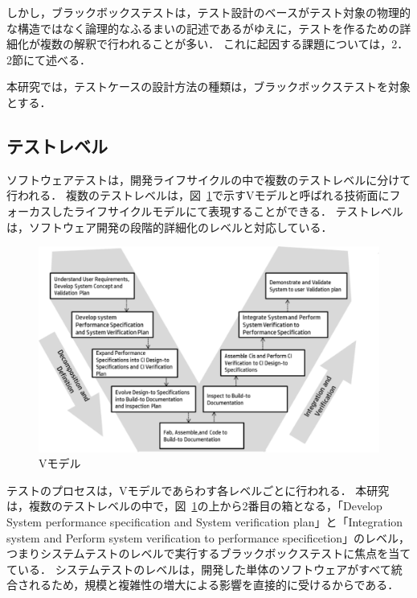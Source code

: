 しかし，ブラックボックステストは，テスト設計のベースがテスト対象の物理的な構造ではなく論理的なふるまいの記述であるがゆえに，テストを作るための詳細化が複数の解釈で行われることが多い．
これに起因する課題については，2．2節にて述べる．

本研究では，テストケースの設計方法の種類は，ブラックボックステストを対象とする．

\subsection{テストレベル}

ソフトウェアテストは，開発ライフサイクルの中で複数のテストレベルに分けて行われる\cite{young2008software}．
複数のテストレベルは，図~\ref{fig:D-2-Fig1}で示すVモデルと呼ばれる技術面にフォーカスしたライフサイクルモデルにて表現することができる\cite{forsberg}．
テストレベルは，ソフトウェア開発の段階的詳細化のレベルと対応している\cite{pressman2005software}．

\begin{figure}[htbp]
  \begin{center}
  \includegraphics[width=12cm]{./image/D-2-Fig1.png}
  \caption{Vモデル}
  \label{fig:D-2-Fig1}
  \end{center}
\end{figure}

テストのプロセスは，Vモデルであらわす各レベルごとに行われる\cite{yumoto2006}．
本研究は，複数のテストレベルの中で，図~\ref{fig:D-2-Fig1}の上から2番目の箱となる，「Develop System performance specification and System verification plan」と「Integration system and Perform system verification to performance specificetion」のレベル，つまりシステムテストのレベルで実行するブラックボックステストに焦点を当てている．
システムテストのレベルは，開発した単体のソフトウェアがすべて統合されるため，規模と複雑性の増大による影響を直接的に受けるからである．

